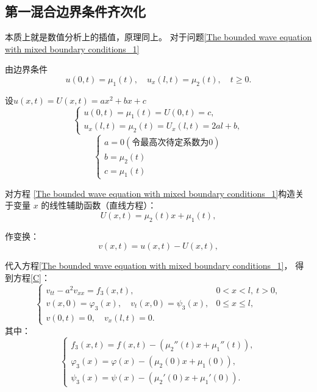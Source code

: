 \documentclass[12pt,a4paper]{article}
\numberwithin{subsection}{section}   %
\numberwithin{subsubsection}{subsection}
\theoremstyle{plain}
\theoremstyle{definition}
\theoremstyle{remark}
\theoremstyle{remark}
\begin{document}
	
		
	\subsection{第一混合边界条件齐次化}
	本质上就是数值分析上的插值，原理同上。
	对于问题\eqref{The bounded wave equation with mixed boundary conditions_1}
	
		由边界条件
	\begin{equation}
		u(0,t) = \mu_1(t), \quad u_x(l,t) = \mu_2(t), \quad t \geq 0.
	\end{equation}
	
	设$u(x, t)=U(x, t)=ax^2+bx+c$
	\[
	\begin{cases}
		u(0, t) = \mu_1(t) = U(0, t) = c, \\
		u_x(l, t) = \mu_2(t) = U_x(l, t) = 2al + b,
	\end{cases}
	\]
	\[
	\begin{cases}
		a = 0 (\text{令最高次待定系数为0})\\
		b =\mu_2(t) \\
		c = \mu_1(t)
	\end{cases}
	\]
	
	对方程 \eqref{The bounded wave equation with mixed boundary conditions_1}构造关于变量 \(x\) 的线性辅助函数（直线方程）：
	\begin{equation}
		U(x, t) =  \mu_2(t) x+\mu_1(t) ,
	\end{equation}
	
	作变换：
	\begin{equation}
		v(x, t) = u(x, t) - U(x, t),
	\end{equation}
	
	代入方程\eqref{The bounded wave equation with mixed boundary conditions_1}，
	得到方程\eqref{C}：
	\begin{equation}\label{C}
		\begin{cases}
			v_{tt} - a^2 v_{xx} = f_3(x, t), & 0 < x < l, \ t > 0, \\
			v(x, 0) = \varphi_3(x), \quad v_t(x, 0) = \psi_3(x), & 0 \leq x \leq l, \\
			v(0, t) = 0, \quad v_x(l, t) = 0. &
		\end{cases}
	\end{equation}
	其中：
\begin{equation}
	\begin{cases}
		f_3(x, t) = f(x, t) - (\mu_2''(t)x + \mu_1''(t)), \\
		\varphi_3(x) = \varphi(x) - (\mu_2(0)x + \mu_1(0)), \\
		\psi_3(x) = \psi(x) - (\mu_2'(0)x + \mu_1'(0)).
	\end{cases}
\end{equation}
	
\end{document}
